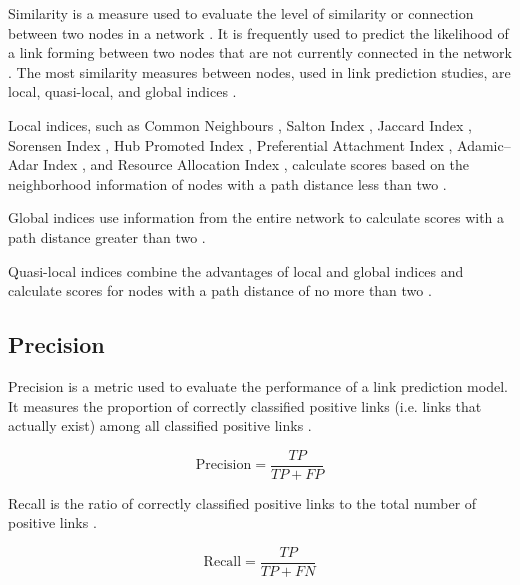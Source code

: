 Similarity is a measure used to evaluate the level of similarity or connection between two nodes in a network \cite{arrar2023comprehensive}. It is frequently used to predict the likelihood of a link forming between two nodes that are not currently connected in the network \cite{arrar2023comprehensive}. The most similarity measures between nodes, used in link prediction studies, are local, quasi-local, and global indices \cite{arrar2023comprehensive}.

Local indices, such as Common Neighbours \cite{newman2001clustering}, Salton Index \cite{salton1973specification}, Jaccard Index \cite{jaccard1901etude}, Sorensen Index \cite{sorensen1948method}, Hub Promoted Index \cite{liben2003link}, Preferential Attachment Index \cite{barabasi1999emergence}, Adamic–Adar Index \cite{adamic2003friends}, and Resource Allocation Index \cite{zhou2010solving}, calculate scores based on the neighborhood information of nodes with a path distance less than two \cite{arrar2023comprehensive}.

Global indices use information from the entire network to calculate scores with a path distance greater than two \cite{arrar2023comprehensive}.

Quasi-local indices combine the advantages of local and global indices and calculate scores for nodes with a path distance of no more than two \cite{arrar2023comprehensive}.




\subsection{Precision}

Precision is a metric used to evaluate the performance of a link prediction model. It measures the proportion of correctly classified positive links (i.e. links that actually exist) among all classified positive links \cite{arrar2023comprehensive}.

\begin{equation}
\label{eq:precision}
  \text{Precision} = \frac{TP}{TP + FP}
\end{equation}

Recall is the ratio of correctly classified positive links to the total number of positive links \cite{arrar2023comprehensive}.

\begin{equation}
\label{eq:recall}
  \text{Recall} = \frac{TP}{TP + FN}
\end{equation}

